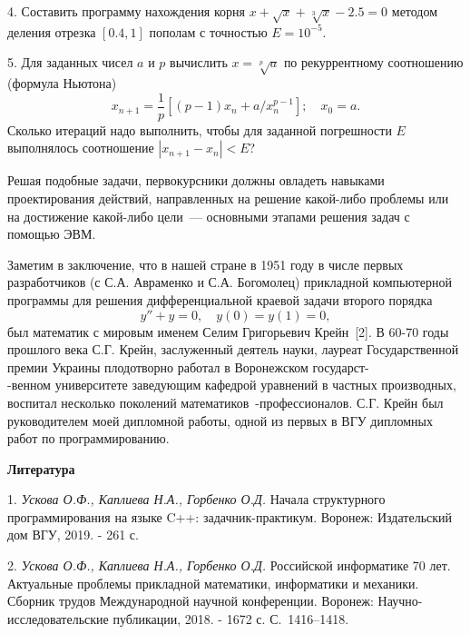 4. Составить программу нахождения корня $x+\sqrt{x}+\sqrt[3]{x}-2.5=0$ методом деления отрезка $[0.4, 1]$ пополам с точностью
$E=10^{-5}$.

5. Для заданных чисел $a$ и $p$ вычислить $x=\sqrt[p]{a}$ по рекуррентному соотношению (формула Ньютона)
$$
x_{n+1}=\frac{1}{p}[(p-1)x_n+a/x_n^{p-1}]; \quad x_0=a.
$$
Сколько итераций надо выполнить, чтобы для заданной погрешности $E$ выполнялось соотношение $|x_{n+1}-x_n|<E$?

Решая подобные задачи, первокурсники должны овладеть навыками проектирования действий, направленных на решение какой-либо
проблемы или на достижение какой-либо цели~--- основными этапами решения задач с помощью ЭВМ.

Заметим в заключение, что в нашей стране в 1951 году в числе первых разработчиков (с С.А. Авраменко и С.А. Богомолец)
прикладной компьютерной программы для решения дифференциальной краевой задачи второго порядка
$$
y''+y=0, \quad y(0)=y(1)=0,
$$
был математик с мировым именем Селим Григорьевич \linebreak Крейн~[2]. В 60-70 годы прошлого века С.Г. Крейн, заслуженный деятель
науки, лауреат Государственной премии \linebreak Украины плодотворно работал в Воронежском государст-\\-венном университете заведующим кафедрой
уравнений в частных производных, воспитал несколько поколений математиков~-профессионалов. С.Г. Крейн был руководителем
моей дипломной работы, одной из первых в ВГУ дипломных работ по программированию.

\smallskip \centerline {\bf Литература} \nopagebreak

1. {\it Ускова О.Ф., Каплиева Н.А., Горбенко О.Д.} Начала структурного программирования на языке C++: задачник-практикум.
Воронеж: Издательский дом ВГУ, 2019. - 261 с.

2. {\it Ускова О.Ф., Каплиева Н.А., Горбенко О.Д.} Российской информатике 70 лет. Актуальные проблемы прикладной математики,
информатики и механики. Сборник трудов Международной научной конференции.
Воронеж: Научно-исследовательские публикации, 2018. - 1672 с. С.~1416--1418.
